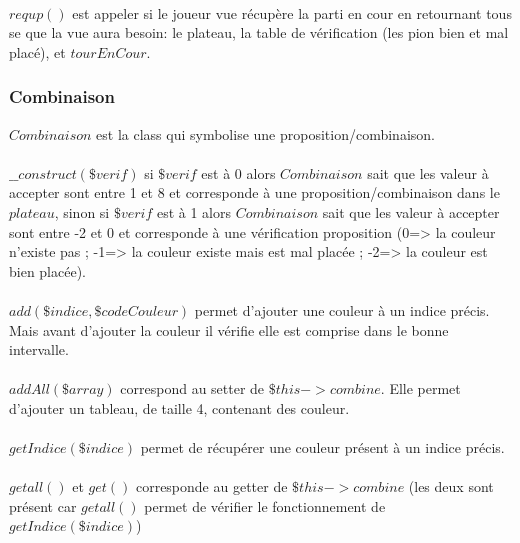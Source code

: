 \documentclass{article}
\begin{document}
            \paragraph{}
            $requp()$ est appeler si le joueur vue récupère la parti en cour en retournant tous se que la vue aura besoin: le plateau, la table de vérification (les pion bien et mal placé), et $tourEnCour$.
            
        \subsubsection{Combinaison}
            $Combinaison$ est la class qui symbolise une proposition/combinaison.
            
            \paragraph{}
            $\_\_construct(\$verif)$ si $\$verif$ est à 0 alors $Combinaison$ sait que les valeur à accepter sont entre 1 et 8 et corresponde à une proposition/combinaison dans le $plateau$, sinon si $\$verif$ est à 1 alors $Combinaison$ sait que les valeur à accepter sont entre -2 et 0 et corresponde à une vérification proposition (0=> la couleur n'existe pas ; -1=> la couleur existe mais est mal placée ; -2=> la couleur est bien placée).
            
            \paragraph{}
            $add(\$indice, \$codeCouleur)$ permet d'ajouter une couleur à un indice précis. Mais avant d'ajouter la couleur il vérifie elle est comprise dans le bonne intervalle.
            
            \paragraph{}
            $addAll(\$array)$ correspond au setter de $\$this->combine$. Elle permet d'ajouter un tableau, de taille 4, contenant des couleur.
            
            \paragraph{}
            $getIndice(\$indice)$ permet de récupérer une couleur présent à un indice précis.
            
            \paragraph{}
            $getall()$ et $get()$ corresponde au getter de $\$this->combine$ (les deux sont présent car $getall()$ permet de vérifier le fonctionnement de $getIndice(\$indice)$)
        
\end{document}

